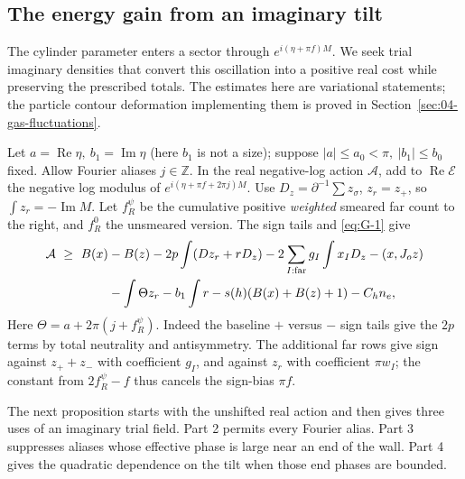 \subsection{The energy gain from an imaginary tilt}

The cylinder parameter enters a sector through
\(e^{i(\eta+\pi f)M}\). We seek trial imaginary densities that
convert this oscillation into a positive real cost while preserving
the prescribed totals. The estimates here are variational statements;
the particle contour deformation implementing them is proved in
Section~\ref{sec:04-gas-fluctuations}.

Let \(a=\operatorname{Re}\eta,\ b_1=\operatorname{Im}\eta\) (here \(b_1\) is not a size); suppose \(|a|\le a_0<\pi,\ |b_1|\le b_0\) fixed. Allow Fourier aliases \(j\in\mathbb Z\). In the real negative-log action \(\mathcal A\), add to \(\operatorname{Re}\mathcal E\) the negative log modulus of \(e^{i(\eta+\pi f+2\pi j)M}\). Use \(D_z=\partial^{-1}\sum z_\sigma\), \(z_r=z_+\), so \(\int z_r=-\operatorname{Im}M\). Let \(f_R^\psi\) be the cumulative positive \emph{weighted} smeared far count to the right, and \(f_R^0\) the unsmeared version. The sign tails and \eqref{eq:G-1} give
\begin{equation}
\begin{split}
 \mathcal A\ \ge\
 B(x)&-B(z)-2p\int(D z_r+r D_z)-2\sum_{I:\rm far}g_I\int x_I D_z
 -(x,J_o z)\\
 &-\int \Theta z_r-b_1\int r-s(h)(B(x)+B(z)+1)-C_h n_e,
\end{split}
 \label{eq:G-4}
\end{equation}
Here \(\Theta=a+2\pi(j+f_R^\psi)\). Indeed the baseline \(+\) versus \(-\) sign tails give the \(2p\) terms by total neutrality and antisymmetry. The additional far rows give sign against \(z_++z_-\) with coefficient \(g_I\), and against \(z_r\) with coefficient \(\pi w_I\); the constant from \(2 f_R^\psi-f\) thus cancels the sign-bias \(\pi f\).

The next proposition starts with the unshifted real action and then gives
three uses of an imaginary trial field.  Part 2 permits every Fourier
alias.  Part 3 suppresses aliases whose effective phase is large near an
end of the wall.  Part 4 gives the quadratic dependence on the tilt when
those end phases are bounded.

